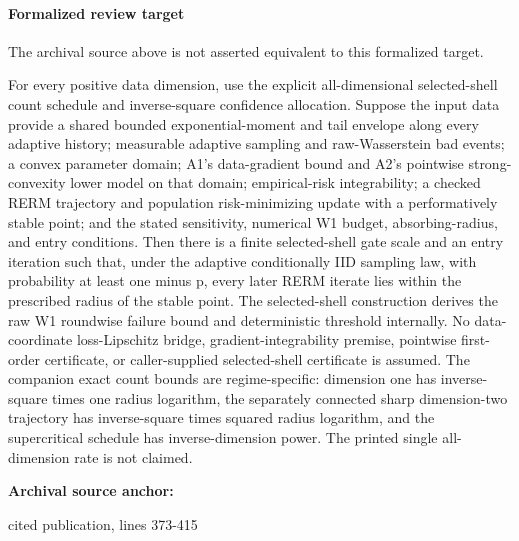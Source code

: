 \documentclass[10pt]{article}
\begin{document}
\paragraph{Formalized review target}
The archival source above is not asserted equivalent to this formalized target.
\begin{ReviewVerbatim}
For every positive data dimension, use the explicit all-dimensional selected-shell count schedule and inverse-square confidence allocation. Suppose the input data provide a shared bounded exponential-moment and tail envelope along every adaptive history; measurable adaptive sampling and raw-Wasserstein bad events; a convex parameter domain; A1's data-gradient bound and A2's pointwise strong-convexity lower model on that domain; empirical-risk integrability; a checked RERM trajectory and population risk-minimizing update with a performatively stable point; and the stated sensitivity, numerical W1 budget, absorbing-radius, and entry conditions. Then there is a finite selected-shell gate scale and an entry iteration such that, under the adaptive conditionally IID sampling law, with probability at least one minus p, every later RERM iterate lies within the prescribed radius of the stable point. The selected-shell construction derives the raw W1 roundwise failure bound and deterministic threshold internally. No data-coordinate loss-Lipschitz bridge, gradient-integrability premise, pointwise first-order certificate, or caller-supplied selected-shell certificate is assumed. The companion exact count bounds are regime-specific: dimension one has inverse-square times one radius logarithm, the separately connected sharp dimension-two trajectory has inverse-square times squared radius logarithm, and the supercritical schedule has inverse-dimension power. The printed single all-dimension rate is not claimed.
\end{ReviewVerbatim}

\textbf{Archival source anchor:} {\footnotesize\raggedright cited publication, lines 373-\allowbreak{}415\par}
\end{document}
